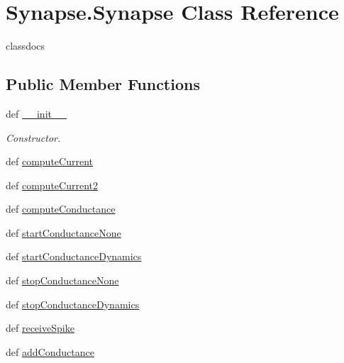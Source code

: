 \hypertarget{class_synapse_1_1_synapse}{\section{Synapse.\-Synapse Class Reference}
\label{class_synapse_1_1_synapse}
}


classdocs  


\subsection*{Public Member Functions}
\begin{DoxyCompactItemize}
\item 
def \hyperlink{class_synapse_1_1_synapse_a2503e88be21ea89ad4f652b2fedfd76e}{\-\_\-\-\_\-init\-\_\-\-\_\-}
\begin{DoxyCompactList}\small\item\em Constructor. \end{DoxyCompactList}\item 
def \hyperlink{class_synapse_1_1_synapse_a744b7b46e7dfee8871f4c3b29fe099ae}{compute\-Current}
\item 
def \hyperlink{class_synapse_1_1_synapse_ad4eb9663dc124db77c7e99578ab7eff7}{compute\-Current2}
\item 
def \hyperlink{class_synapse_1_1_synapse_a88599102e16f4fe28f9cf7580c3a8108}{compute\-Conductance}
\item 
def \hyperlink{class_synapse_1_1_synapse_af9d45f19ead577a6d98d9dd5e304cb13}{start\-Conductance\-None}
\item 
def \hyperlink{class_synapse_1_1_synapse_a6d3fc87143221f0bcfdb5f86095099c5}{start\-Conductance\-Dynamics}
\item 
def \hyperlink{class_synapse_1_1_synapse_aa8deb85e48c1a9b27453e0ebde27b2cf}{stop\-Conductance\-None}
\item 
def \hyperlink{class_synapse_1_1_synapse_a25802c58dc6c64cd265f7cbae3c07958}{stop\-Conductance\-Dynamics}
\item 
def \hyperlink{class_synapse_1_1_synapse_a18fc05b9e95285fded46afa38688a052}{receive\-Spike}
\item 
def \hyperlink{class_synapse_1_1_synapse_a4fa7b6b92a4b197dba58ac346cfffc6f}{add\-Conductance}
\end{DoxyCompactItemize}
